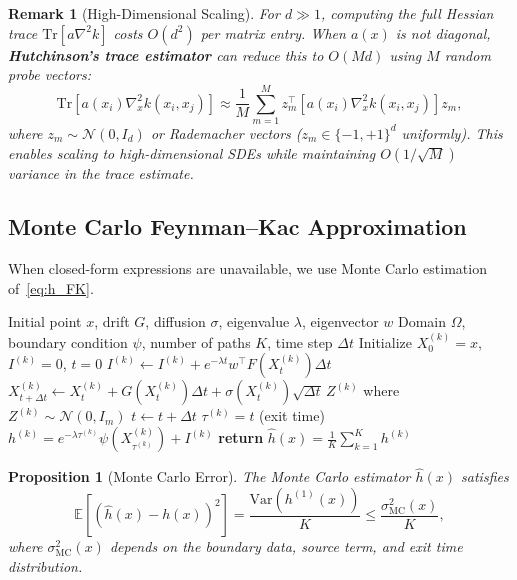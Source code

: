 \documentclass[11pt,a4paper]{article}
\newtheorem{proposition}[theorem]{Proposition}
\newtheorem{remark}[theorem]{Remark}
\newcommand{\E}{\mathbb{E}}
\newcommand{\Var}{\mathrm{Var}}
\newcommand{\Tr}{\mathrm{Tr}}
\begin{document}
\begin{remark}[High-Dimensional Scaling]
For $d \gg 1$, computing the full Hessian trace $\Tr[a \nabla^2 k]$ costs $O(d^2)$ per matrix entry. When $a(x)$ is not diagonal, \textbf{Hutchinson's trace estimator} can reduce this to $O(Md)$ using $M$ random probe vectors:
\begin{equation}
\Tr[a(x_i) \nabla_x^2 k(x_i, x_j)] \approx \frac{1}{M} \sum_{m=1}^M z_m^\top [a(x_i) \nabla_x^2 k(x_i, x_j)] z_m,
\end{equation}
where $z_m \sim \mathcal{N}(0, I_d)$ or Rademacher vectors ($z_m \in \{-1, +1\}^d$ uniformly). This enables scaling to high-dimensional SDEs while maintaining $O(1/\sqrt{M})$ variance in the trace estimate.
\end{remark}

\subsection{Monte Carlo Feynman--Kac Approximation}

When closed-form expressions are unavailable, we use Monte Carlo estimation of~\eqref{eq:h_FK}.

\begin{algorithm}[H]
\caption{Monte Carlo Feynman--Kac Estimation}
\label{alg:mc_fk}
\begin{algorithmic}[1]
\Require Initial point $x$, drift $G$, diffusion $\sigma$, eigenvalue $\lambda$, eigenvector $w$
\Require Domain $\Omega$, boundary condition $\psi$, number of paths $K$, time step $\Delta t$
\State Initialize $X_0^{(k)} = x$, $I^{(k)} = 0$, $t = 0$
\State $I^{(k)} \gets I^{(k)} + e^{-\lambda t} w^\top F(X_t^{(k)}) \Delta t$
\State $X_{t+\Delta t}^{(k)} \gets X_t^{(k)} + G(X_t^{(k)}) \Delta t + \sigma(X_t^{(k)}) \sqrt{\Delta t} \, Z^{(k)}$ where $Z^{(k)} \sim \mathcal{N}(0, I_m)$
\State $t \gets t + \Delta t$
\EndWhile
\State $\tau^{(k)} = t$ (exit time)
\State $h^{(k)} = e^{-\lambda \tau^{(k)}} \psi(X_{\tau^{(k)}}^{(k)}) + I^{(k)}$
\EndFor
\State \textbf{return} $\widehat{h}(x) = \frac{1}{K} \sum_{k=1}^K h^{(k)}$
\end{algorithmic}
\end{algorithm}

\begin{proposition}[Monte Carlo Error]\label{prop:mc_error}
The Monte Carlo estimator $\widehat{h}(x)$ satisfies
\begin{equation}
\E[(\widehat{h}(x) - h(x))^2] = \frac{\Var(h^{(1)}(x))}{K} \leq \frac{\sigma_{\mathrm{MC}}^2(x)}{K},
\end{equation}
where $\sigma_{\mathrm{MC}}^2(x)$ depends on the boundary data, source term, and exit time distribution.
\end{proposition}
\end{document}
